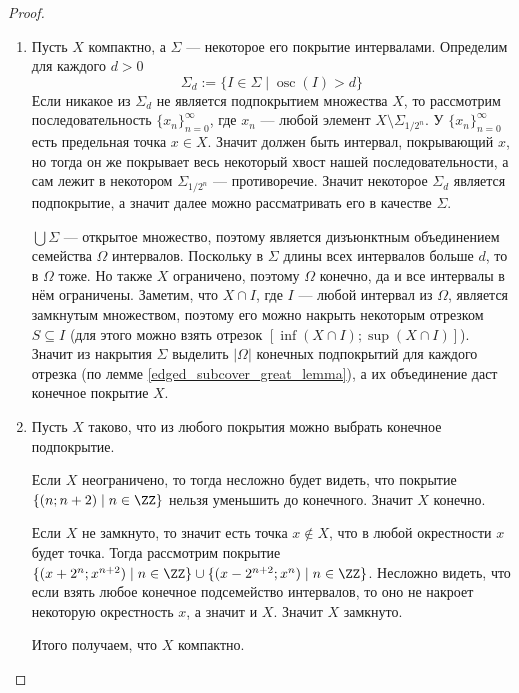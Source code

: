 \documentclass[12pt,a4paper]{article}
\DeclareMathOperator{\osc}{osc}
\begin{document}
    \begin{proof}
        \begin{enumerate}
            \item Пусть $X$ компактно, а $\Sigma$ --- некоторое его покрытие интервалами. Определим для каждого $d > 0$
                \[\Sigma_d := \{I \in \Sigma\mid \osc(I) > d\}\]
                Если никакое из $\Sigma_d$ не является подпокрытием множества $X$, то рассмотрим последовательность $\{x_n\}_{n=0}^\infty$, где $x_n$ --- любой элемент $X \setminus \Sigma_{1/2^n}$. У $\{x_n\}_{n=0}^\infty$ есть предельная точка $x \in X$. Значит должен быть интервал, покрывающий $x$, но тогда он же покрывает весь некоторый хвост нашей последовательности, а сам лежит в некотором $\Sigma_{1/2^n}$ --- противоречие. Значит некоторое $\Sigma_d$ является подпокрытие, а значит далее можно рассматривать его в качестве $\Sigma$.

                $\bigcup \Sigma$ --- открытое множество, поэтому является дизъюнктным объединением семейства $\Omega$ интервалов. Поскольку в $\Sigma$ длины всех интервалов больше $d$, то в $\Omega$ тоже. Но также $X$ ограничено, поэтому $\Omega$ конечно, да и все интервалы в нём ограничены. Заметим, что $X \cap I$, где $I$ --- любой интервал из $\Omega$, является замкнутым множеством, поэтому его можно накрыть некоторым отрезком $S \subseteq I$ (для этого можно взять отрезок $[\inf(X \cap I); \sup(X \cap I)]$). Значит из накрытия $\Sigma$ выделить $|\Omega|$ конечных подпокрытий для каждого отрезка (по лемме \ref{edged_subcover_great_lemma}), а их объединение даст конечное покрытие $X$.

            \item Пусть $X$ таково, что из любого покрытия можно выбрать конечное подпокрытие.
            
                Если $X$ неограничено, то тогда несложно будет видеть, что покрытие $\{(n; n+2) \mid n \in \ZZ\}$ нельзя уменьшить до конечного. Значит $X$ конечно.

                Если $X$ не замкнуто, то значит есть точка $x \notin X$, что в любой окрестности $x$ будет точка. Тогда рассмотрим покрытие $\{(x + 2^n; x^{n+2}) \mid n \in \ZZ\} \cup \{(x - 2^{n+2}; x^n) \mid n \in \ZZ\}$. Несложно видеть, что если взять любое конечное подсемейство интервалов, то оно не накроет некоторую окрестность $x$, а значит и $X$. Значит $X$ замкнуто.

                Итого получаем, что $X$ компактно.
        \end{enumerate}
    \end{proof}
\end{document}
